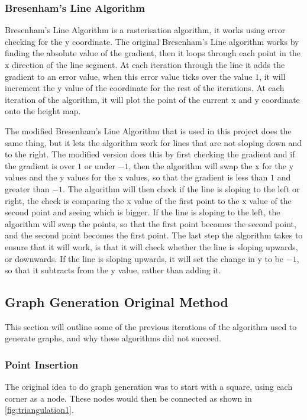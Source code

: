 \subsubsection{Bresenham's Line Algorithm}
	Bresenham's Line Algorithm is a rasterisation algorithm, it works using error checking for the y coordinate. The original Bresenham's Line algorithm works by finding the absolute value of the gradient, then it loops through each point in the x direction of the line segment. At each iteration through the line it adds the gradient to an error value, when this error value ticks over the value $1$, it will increment the y value of the coordinate for the rest of the iterations. At each iteration of the algorithm, it will plot the point of the current x and y coordinate onto the height map.
	\newline
	\par
	The modified Bresenham's Line Algorithm that is used in this project does the same thing, but it lets the algorithm work for lines that are not sloping down and to the right. The modified version does this by first checking the gradient and if the gradient is over $1$ or under $-1$, then the algorithm will swap the x for the y values and the y values for the x values, so that the gradient is less than $1$ and greater than $-1$. The algorithm will then check if the line is sloping to the left or right, the check is comparing the x value of the first point to the x value of the second point and seeing which is bigger. If the line is sloping to the left, the algorithm will swap the points, so that the first point becomes the second point, and the second point becomes the first point. The last step the algorithm takes to ensure that it will work, is that it will check whether the line is sloping upwards, or downwards. If the line is sloping upwards, it will set the change in y to be $-1$, so that it subtracts from the y value, rather than adding it.


\subsection{Graph Generation Original Method}\label{subsec:GGOM}
This section will outline some of the previous iterations of the algorithm used to generate graphs, and why these algorithms did not succeed.
\subsubsection{Point Insertion}
	The original idea to do graph generation was to start with a square, using each corner as a node. These nodes would then be connected as shown in \ref{fig:triangulation1}.\\

